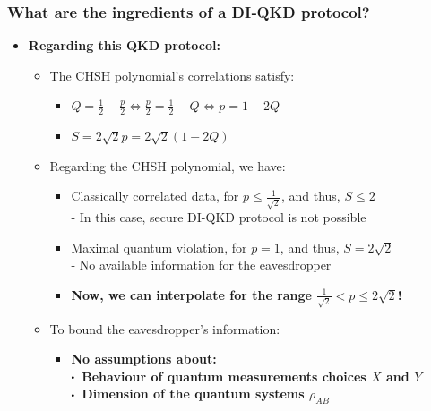 \documentclass{beamer}
\newcommand\sbullet[1][.5]{\mathbin{\vcenter{\hbox{\scalebox{#1}{$\bullet$}}}}}
\begin{document}
    \begin{frame}
        \frametitle{\large What are the ingredients of a DI‑QKD protocol?}

        \vspace{3ex}
        \begin{itemize}
            \item \textbf{Regarding this QKD protocol:}
            \begin{itemize}
                \item The CHSH polynomial's correlations satisfy:
                \begin{itemize}
                    \item $Q = \frac{1}{2} - \frac{p}{2} \Leftrightarrow \frac{p}{2} = \frac{1}{2} - Q \Leftrightarrow p = 1 - 2Q$
                    \item $S = 2 \sqrt{2} p = 2 \sqrt{2} (1 - 2Q)$
                \end{itemize}
                \vspace{1ex}
                \item Regarding the CHSH polynomial, we have:
                \begin{itemize}
                    \item Classically correlated data, for $p \leq \frac{1}{\sqrt{2}}$, and thus, $S \leq 2$\\
                    - In this case, secure DI-QKD protocol is not possible
                    \item Maximal quantum violation, for $p = 1$, and thus, $S = 2\sqrt{2}$\\
                    - No available information for the eavesdropper
                    \vspace{0.75ex}
                    \item \textbf{Now, we can interpolate for the range $\frac{1}{\sqrt{2}} < p \leq 2\sqrt{2}$!}
                \end{itemize}
                \vspace{1ex}
                \item To bound the eavesdropper's information:
                \begin{itemize}
                    \item \textbf{No assumptions about:}\\
                    \footnotesize
                    $\sbullet$\, \textbf{Behaviour of quantum measurements choices $X$ and $Y$}\\
                    $\sbullet$\, \textbf{Dimension of the quantum systems ${\rho}_{AB}$}
                \end{itemize}
            \end{itemize}
        \end{itemize}
    \end{frame}
\end{document}
